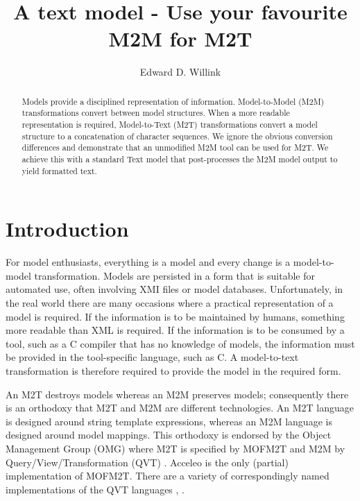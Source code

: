 \documentclass{llncs}
\begin{document}
%
\mainmatter              %
%
\title{A text model - Use your favourite M2M for M2T}
%
%
\author{Edward D. Willink}
%
%
%


\maketitle              %

\begin{abstract}
Models provide a disciplined representation of information. Model-to-Model (M2M) transformations convert between model structures. When a more readable representation is required, Model-to-Text (M2T) transformations convert a model structure to a concatenation of character sequences. We ignore the obvious conversion differences and demonstrate that an unmodified M2M tool can be used for M2T. We achieve this with a standard Text model that post-processes the M2M model output to yield formatted text. 

\end{abstract}
%
\section{Introduction}
%
For model enthusiasts, everything is a model and every change is a model-to-model transformation. Models are persisted in a form that is suitable for automated use, often involving XMI files or model databases. Unfortunately, in the real world there are many occasions where a practical representation of a model is required. If the information is to be maintained by humans, something more readable than XML is required. If the information is to be consumed by a tool, such as a C compiler that has no knowledge of models, the information must be provided in the tool-specific language, such as C. A model-to-text transformation is therefore required to provide the model in the required form.

An M2T destroys models whereas an M2M preserves models; consequently there is an orthodoxy that M2T and M2M are different technologies. An M2T language is designed around string template expressions, whereas an M2M language is designed around model mappings. This orthodoxy is endorsed by the Object Management Group (OMG) where M2T is specified by MOFM2T \cite{MOFM2T-1.0} and M2M by Query/View/Transformation (QVT) \cite{QVT-1.3}. Acceleo \cite{Eclipse-Acceleo} is the only (partial) implementation of MOFM2T. There are a variety of correspondingly named implementations of the QVT languages \cite{Eclipse-QVTd}, \cite{Eclipse-QVTo}. 
\end{document}
